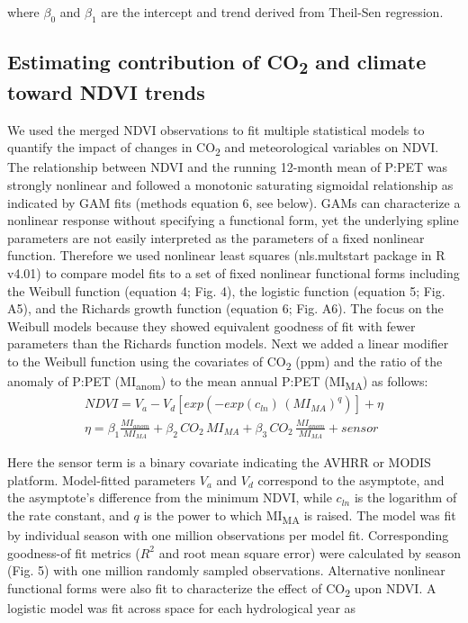 \documentclass[gc, manuscript]{copernicus}
\begin{document}
where \(\beta_0\) and \(\beta_1\) are the intercept and trend derived
from Theil-Sen regression.

\subsection{\texorpdfstring{Estimating contribution of
CO\textsubscript{2} and climate toward NDVI
trends}{Estimating contribution of CO2 and climate toward NDVI trends}}

We used the merged NDVI observations to fit multiple statistical models
to quantify the impact of changes in CO\textsubscript{2} and
meteorological variables on NDVI. The relationship between NDVI and the
running 12-month mean of P:PET was strongly nonlinear and followed a
monotonic saturating sigmoidal relationship as indicated by GAM fits
(methods equation 6, see below). GAMs can characterize a nonlinear
response without specifying a functional form, yet the underlying spline
parameters are not easily interpreted as the parameters of a fixed
nonlinear function. Therefore we used nonlinear least squares
(nls.multstart package \citep{padfield_matheson20} in R v4.01) to
compare model fits to a set of fixed nonlinear functional forms
including the Weibull function (equation 4; Fig. 4), the logistic
function (equation 5; Fig. A5), and the Richards growth function
(equation 6; Fig. A6). The focus on the Weibull models because they
showed equivalent goodness of fit with fewer parameters than the
Richards function models. Next we added a linear modifier to the Weibull
function using the covariates of CO\textsubscript{2} (ppm) and the ratio
of the anomaly of P:PET (MI\textsubscript{anom}) to the mean annual
P:PET (MI\textsubscript{MA}) as follows: \begin{align}
NDVI=V_a-V_d[exp(-exp(c_{ln})\,(MI_{MA})^{q})]+\eta\\
\eta = \beta_{1}\frac{MI_{anom}}{MI_{MA}}+\beta_{2}\,CO_2\,MI_{MA} +\beta_{3}\,CO_2\,\frac{MI_{anom}}{MI_{MA}}+sensor\nonumber
\end{align}

Here the sensor term is a binary covariate indicating the AVHRR or MODIS
platform. Model-fitted parameters \(V_a\) and \(V_d\) correspond to the
asymptote, and the asymptote's difference from the minimum NDVI, while
\(c_{ln}\) is the logarithm of the rate constant, and \(q\) is the power
to which MI\textsubscript{MA} is raised. The model was fit by individual
season with one million observations per model fit. Corresponding
goodness-of fit metrics (\(R^2\) and root mean square error) were
calculated by season (Fig. 5) with one million randomly sampled
observations. Alternative nonlinear functional forms were also fit to
characterize the effect of CO\textsubscript{2} upon NDVI. A logistic
model was fit across space for each hydrological year as
\end{document}
